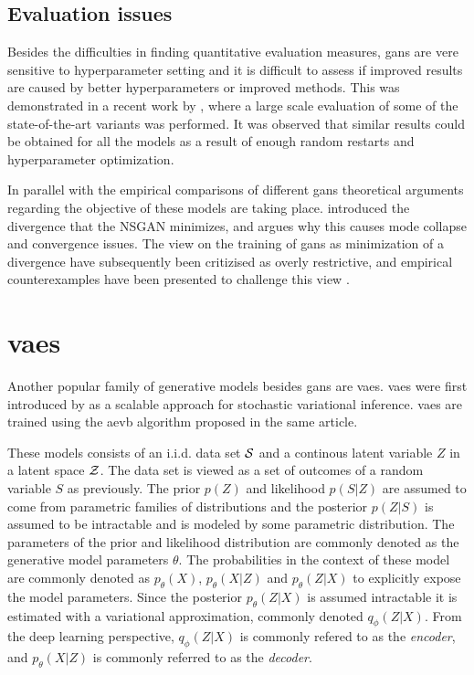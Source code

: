 \subsection{Evaluation issues}
Besides the difficulties in finding quantitative evaluation measures, \acrshort{gans} are vere sensitive to hyperparameter setting and it is difficult to assess if improved results are caused by better hyperparameters or improved methods. This was demonstrated in a recent work by \textcite{lucic2017gans}, where a large scale evaluation of some of the state-of-the-art variants was performed. It was observed that similar results could be obtained for all the models as a result of enough random restarts and hyperparameter optimization.

In parallel with the empirical comparisons of different \acrshort{gans} theoretical arguments regarding the objective of these models are taking place. \textcite{arjovsky2017towards} introduced the divergence that the NSGAN minimizes, and argues why this causes mode collapse and convergence issues. The view on the training of \acrshort{gans} as minimization of a divergence have subsequently been critizised as overly restrictive, and empirical counterexamples have been presented to challenge this view \textcite{fedus2017many}.


\section{\acrlong{vaes}}
Another popular family of generative models besides \acrshort{gans} are \acrfull{vaes}. \acrlong{vaes} were first introduced by \textcite{kingma2013auto} as a scalable approach for stochastic variational inference. \acrshort{vaes} are trained using the \acrfull{aevb} algorithm proposed in the same article. 

These models consists of an i.i.d. data set $\mathcal{S}$ and a continous latent variable $Z$ in a latent space $\mathcal{Z}$. The data set is viewed as a set of outcomes of a random variable $S$ as previously. The prior $p(Z)$ and likelihood $p(S|Z)$ are assumed to come from parametric families of distributions and the posterior $p(Z|S)$ is assumed to be intractable and is modeled by some parametric distribution. The parameters of the prior and likelihood distribution are commonly denoted as the generative model parameters $\theta$. The probabilities in the context of these model are commonly denoted as $p_\theta(X)$, $p_\theta(X|Z)$ and $p_\theta(Z|X)$ to explicitly expose the model parameters. Since the posterior $p_\theta(Z|X)$ is assumed intractable it is estimated with a variational approximation, commonly denoted $q_\phi(Z|X)$. From the deep learning perspective, $q_\phi(Z|X)$ is commonly refered to as the \textit{encoder}, and $p_\theta(X|Z)$ is commonly referred to as the \textit{decoder}.

